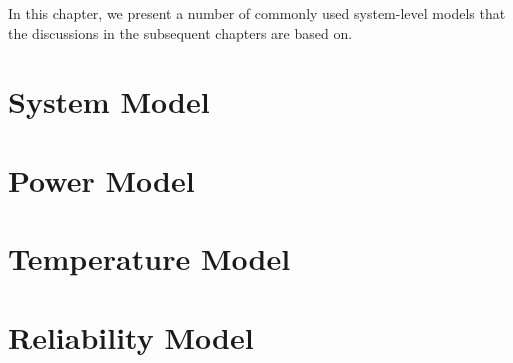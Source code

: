 In this chapter, we present a number of commonly used system-level models that
the discussions in the subsequent chapters are based on.

\section{System Model}

\section{Power Model}

\section{Temperature Model}

\section{Reliability Model}
